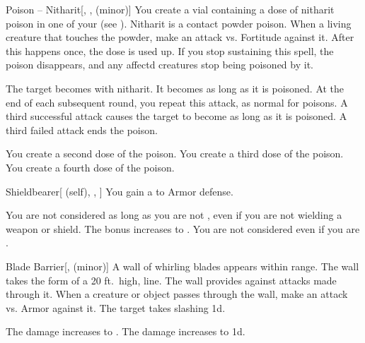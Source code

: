 \lowercase{\hypertarget{spell:Poison -- Nitharit}{}}\label{spell:Poison -- Nitharit}
\begin{freeability}[Rank 1]{\hypertarget{spell:Poison -- Nitharit}{Poison -- Nitharit}}[, ,  (minor)]
You create a vial containing a dose of nitharit poison in one of your  (see ).
Nitharit is a contact powder poison.
When a living creature that touches the powder, make an attack vs. Fortitude against it.
After this happens once, the dose is used up.
If you stop sustaining this spell, the poison disappears, and any affectd creatures stop being poisoned by it.

\hit The target becomes  with nitharit.
It becomes  as long as it is poisoned.
At the end of each subsequent round, you repeat this attack, as normal for poisons.
A third successful attack causes the target to become  as long as it is poisoned.
A third failed attack ends the poison.

\rankline
{} You create a second dose of the poison.
 You create a third dose of the poison.
 You create a fourth dose of the poison.
\end{freeability}
\vspace{0.25em}



\lowercase{\hypertarget{spell:Shieldbearer}{}}\label{spell:Shieldbearer}
\begin{attuneability}[Rank 1]{\hypertarget{spell:Shieldbearer}{Shieldbearer}}[ (self), , ]
You gain a   to Armor defense.

\rankline
{} You are not considered  as long as you are not , even if you are not wielding a weapon or shield.
 The bonus increases to .
 You are not considered  even if you are .
\end{attuneability}
\vspace{0.25em}



\lowercase{\hypertarget{spell:Blade Barrier}{}}\label{spell:Blade Barrier}
\begin{freeability}[Rank 3]{\hypertarget{spell:Blade Barrier}{Blade Barrier}}[,  (minor)]
A wall of whirling blades appears within \rngmed range.
The wall takes the form of a 20 ft.\ high, \arealarge line.
The wall provides  against attacks made through it.
When a creature or object passes through the wall, make an attack vs. Armor against it.
\hit The target takes slashing  \minus1d.

\rankline
{} The damage increases to .
 The damage increases to  \plus1d.
\end{freeability}
\vspace{0.25em}




